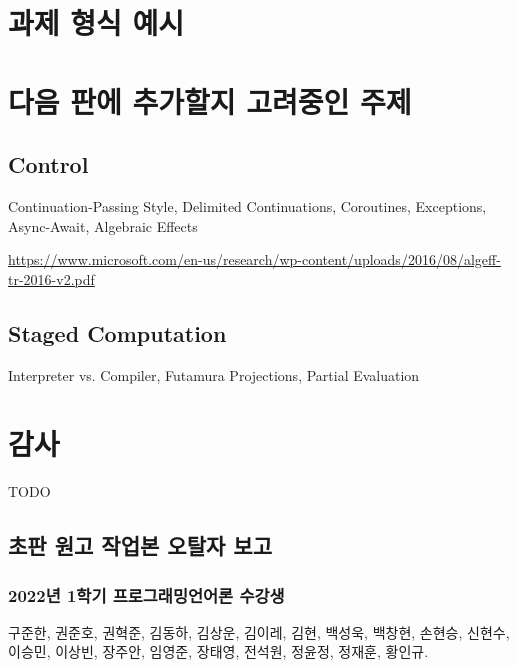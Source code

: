 \printbibliography[title=참고문헌]

\AppendixTitleToToc
\AttachAppendixTitleToSecnum

\appendix
\appendixpage*


\section{과제 형식 예시}


\newpage

\section{다음 판에 추가할지 고려중인 주제}
\subsection{Control}
Continuation-Passing Style,
Delimited Continuations,
Coroutines, Exceptions, Async-Await,
Algebraic Effects

\url{https://www.microsoft.com/en-us/research/wp-content/uploads/2016/08/algeff-tr-2016-v2.pdf}

\subsection{Staged Computation}
Interpreter vs. Compiler, Futamura Projections, Partial Evaluation

\newpage

\section{감사}
TODO

\subsection{초판 원고 작업본 오탈자 보고}
\subsubsection{2022년 1학기 프로그래밍언어론 수강생}
구준한,
권준호,
권혁준,
김동하,
김상운,
김이레,
김현,
백성욱,
백창현,
손현승,
신현수,
이승민,
이상빈,
장주안,
임영준,
장태영,
전석원,
정윤정,
정재훈,
황인규.

